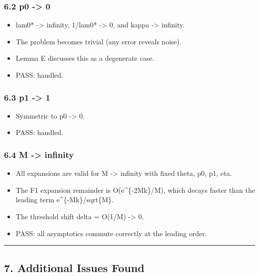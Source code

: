 \documentclass[
  12pt,
]{ctexart}
\providecommand{\tightlist}{%
  \setlength{\itemsep}{0pt}\setlength{\parskip}{0pt}}
\begin{document}
\subsubsection{6.2 p0 -\textgreater{} 0}\label{p0---0}

\begin{itemize}
\tightlist
\item
  lam0* -\textgreater{} infinity, 1/lam0* -\textgreater{} 0, and kappa
  -\textgreater{} infinity.
\item
  The problem becomes trivial (any error reveals noise).
\item
  Lemma E discusses this as a degenerate case.
\item
  PASS: handled.
\end{itemize}

\subsubsection{6.3 p1 -\textgreater{} 1}\label{p1---1}

\begin{itemize}
\tightlist
\item
  Symmetric to p0 -\textgreater{} 0.
\item
  PASS: handled.
\end{itemize}

\subsubsection{6.4 M -\textgreater{} infinity}\label{m---infinity}

\begin{itemize}
\tightlist
\item
  All expansions are valid for M -\textgreater{} infinity with fixed
  theta, p0, p1, eta.
\item
  The F1 expansion remainder is O(e\^{}\{-2Mk\}/M), which decays faster
  than the leading term e\^{}\{-Mk\}/sqrt\{M\}.
\item
  The threshold shift delta = O(1/M) -\textgreater{} 0.
\item
  PASS: all asymptotics commute correctly at the leading order.
\end{itemize}

\begin{center}\rule{0.5\linewidth}{0.5pt}\end{center}

\subsection{7. Additional Issues Found}\label{additional-issues-found}
\end{document}
